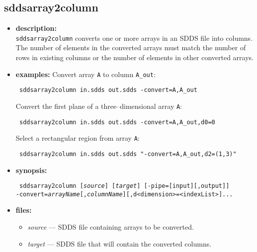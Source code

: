 \newpage
\subsection{sddsarray2column}
\label{sddsarray2column}

\begin{itemize}
\item {\bf description:} \hspace*{1mm}\\
{\tt sddsarray2column} converts one or more arrays in an SDDS file into columns. The
number of elements in the converted arrays must match the number of rows in
existing columns or the number of elements in other converted arrays.

\item {\bf examples:}
Convert array \verb|A| to column \verb|A_out|:
\begin{flushleft}{\tt
sddsarray2column in.sdds out.sdds -convert=A,A_out
}\end{flushleft}
Convert the first plane of a three--dimensional array \verb|A|:
\begin{flushleft}{\tt
sddsarray2column in.sdds out.sdds -convert=A,A_out,d0=0
}\end{flushleft}
Select a rectangular region from array \verb|A|:
\begin{flushleft}{\tt
sddsarray2column in.sdds out.sdds "-convert=A,A_out,d2=(1,3)"
}\end{flushleft}

\item {\bf synopsis:}
\begin{flushleft}{\tt
sddsarray2column [{\em source}] [{\em target}] [-pipe=[input][,output]]\\
[-nowarnings] -convert={\em arrayName}[,{\em columnName}][,d<dimension>=<indexList>]...
}\end{flushleft}

\item {\bf files:}
\begin{itemize}
  \item {\em source} --- SDDS file containing arrays to be converted.
  \item {\em target} --- SDDS file that will contain the converted columns.
\end{itemize}


\end{itemize}
